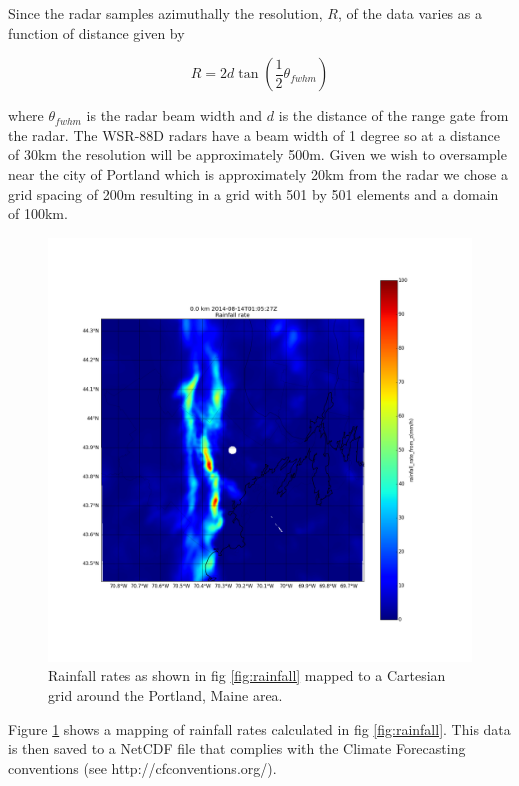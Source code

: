 \documentclass[twocol]{ametsoc}
\begin{document}
Since the radar samples azimuthally the resolution, $R$, of the data 
varies as a function of distance given by

\begin{equation}
R = 2d\tan(\frac{1}{2}\theta_{fwhm})
\end{equation}

where $\theta_{fwhm}$ is the radar beam width and $d$ is the distance of the range gate from the radar. 
The WSR-88D radars have a beam width of 1 degree so at a distance of 30km the resolution will be approximately
 500m. Given we wish to oversample near the city of Portland which is approximately 20km from the radar we chose
 a grid spacing of 200m resulting in a grid with 501 by 501 elements and a domain of 100km. 

 \begin{figure}[h]
    \centering
    \includegraphics[width=0.95\columnwidth]{mapped.png}
    \caption{Rainfall rates as shown in fig \ref{fig:rainfall} mapped to a Cartesian grid around the Portland, Maine area.}
    \label{fig:mapped}
\end{figure}

Figure \ref{fig:mapped} shows a mapping of rainfall rates calculated in fig \ref{fig:rainfall}. This data is then saved to a NetCDF file that complies 
with the Climate Forecasting conventions (see http://cfconventions.org/).
\end{document}
